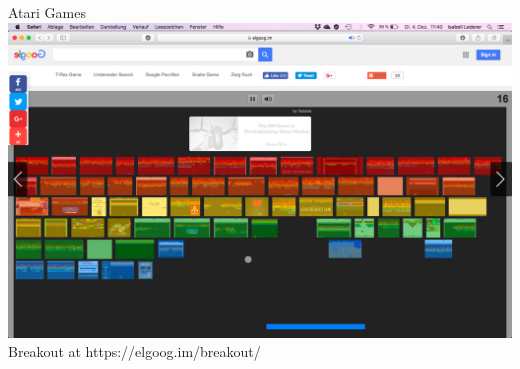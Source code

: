 \documentclass{beamer}
\begin{document}
\begin{frame}{Atari Games}
\centering
\includegraphics[scale=0.2]{Images/elgoog_breakout}
Breakout at https://elgoog.im/breakout/
\end{frame}
\end{document}
